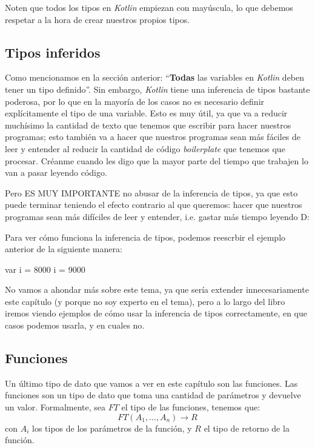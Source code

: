     \begin{important}
      Noten que todos los tipos en \textit{Kotlin} empiezan con mayúscula, lo que debemos respetar a 
      la hora de crear nuestros propios tipos.
    \end{important}

  \subsection{Tipos inferidos}
    Como mencionamos en la sección anterior: \enquote{\textbf{Todas} las variables en 
    \textit{Kotlin} deben tener un tipo definido}.
    Sin embargo, \textit{Kotlin} tiene una inferencia de tipos bastante poderosa, por lo que en la 
    mayoría de los casos no es necesario definir explícitamente el tipo de una variable.
    Esto es muy útil, ya que va a reducir muchísimo la cantidad de texto que tenemos que escribir
    para hacer nuestros programas; esto también va a hacer que nuestros programas sean más fáciles
    de leer y entender al reducir la cantidad de código \textit{boilerplate} que tenemos que 
    procesar.
    Créanme cuando les digo que la mayor parte del tiempo que trabajen lo van a pasar leyendo 
    código.

    Pero ES MUY IMPORTANTE no abusar de la inferencia de tipos, ya que esto puede terminar teniendo
    el efecto contrario al que queremos: hacer que nuestros programas sean más difíciles de leer y
    entender, i.e. gastar más tiempo leyendo D:

    Para ver cómo funciona la inferencia de tipos, podemos reescrbir el ejemplo anterior de la
    siguiente manera:

    \begin{kotlin}
      var i = 8000
      i = 9000
    \end{kotlin}
    
    No vamos a ahondar más sobre este tema, ya que sería extender innecesariamente este capítulo (y
    porque no soy experto en el tema), pero a lo largo del libro iremos viendo ejemplos de cómo
    usar la inferencia de tipos correctamente, en que casos podemos usarla, y en cuales no.

  \subsection{Funciones}
    Un último tipo de dato que vamos a ver en este capítulo son las funciones.
    Las funciones son un tipo de dato que toma una cantidad de parámetros y devuelve un valor.
    Formalmente, sea \(FT\) el tipo de las funciones, tenemos que:
    \[
      FT(A_1, \dots, A_n) \rightarrow R
    \]
    con \(A_i\) los tipos de los parámetros de la función, y \(R\) el tipo de retorno de la función.

